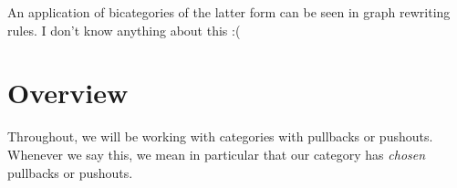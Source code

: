 \documentclass[11pt]{amsart}
\theoremstyle{remark}
\theoremstyle{definition}
\begin{document}
An application of bicategories of the latter form can be seen in graph rewriting rules. I don't know anything about this :(


\section{Overview} %
\label{sec:Overview}


Throughout, we will be working with categories with pullbacks or pushouts. Whenever we say this, we mean in particular that our category has \textit{chosen} pullbacks or pushouts.  
\end{document}
